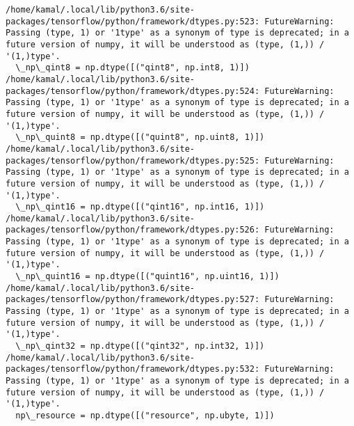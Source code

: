 \documentclass[11pt]{article}
\begin{document}
    \begin{Verbatim}[commandchars=\\\{\}]
/home/kamal/.local/lib/python3.6/site-packages/tensorflow/python/framework/dtypes.py:523: FutureWarning: Passing (type, 1) or '1type' as a synonym of type is deprecated; in a future version of numpy, it will be understood as (type, (1,)) / '(1,)type'.
  \_np\_qint8 = np.dtype([("qint8", np.int8, 1)])
/home/kamal/.local/lib/python3.6/site-packages/tensorflow/python/framework/dtypes.py:524: FutureWarning: Passing (type, 1) or '1type' as a synonym of type is deprecated; in a future version of numpy, it will be understood as (type, (1,)) / '(1,)type'.
  \_np\_quint8 = np.dtype([("quint8", np.uint8, 1)])
/home/kamal/.local/lib/python3.6/site-packages/tensorflow/python/framework/dtypes.py:525: FutureWarning: Passing (type, 1) or '1type' as a synonym of type is deprecated; in a future version of numpy, it will be understood as (type, (1,)) / '(1,)type'.
  \_np\_qint16 = np.dtype([("qint16", np.int16, 1)])
/home/kamal/.local/lib/python3.6/site-packages/tensorflow/python/framework/dtypes.py:526: FutureWarning: Passing (type, 1) or '1type' as a synonym of type is deprecated; in a future version of numpy, it will be understood as (type, (1,)) / '(1,)type'.
  \_np\_quint16 = np.dtype([("quint16", np.uint16, 1)])
/home/kamal/.local/lib/python3.6/site-packages/tensorflow/python/framework/dtypes.py:527: FutureWarning: Passing (type, 1) or '1type' as a synonym of type is deprecated; in a future version of numpy, it will be understood as (type, (1,)) / '(1,)type'.
  \_np\_qint32 = np.dtype([("qint32", np.int32, 1)])
/home/kamal/.local/lib/python3.6/site-packages/tensorflow/python/framework/dtypes.py:532: FutureWarning: Passing (type, 1) or '1type' as a synonym of type is deprecated; in a future version of numpy, it will be understood as (type, (1,)) / '(1,)type'.
  np\_resource = np.dtype([("resource", np.ubyte, 1)])

    \end{Verbatim}
\end{document}
